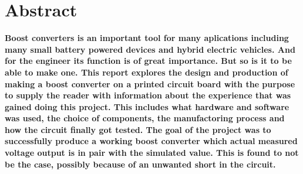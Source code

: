 \section{Abstract}
\textbf{Boost converters is an important tool for many aplications including many small battery powered devices and hybrid electric vehicles. And for the engineer its function is of great importance. But so is it to be able to make one. This report explores the design and production of making a boost converter on a printed circuit board with the purpose to supply the reader with information about the experience that was gained doing this project. This includes what hardware and software was used, the choice of components, the manufactoring process and how the circuit finally got tested. The goal of the project was to successfully produce a working boost converter which actual measured voltage output is in pair with the simulated value. This is found to not be the case, possibly because of an unwanted short in the circuit.}
